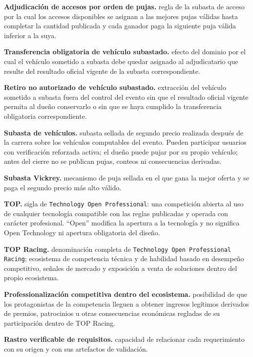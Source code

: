 \documentclass[10pt,letterpaper]{article}
\begin{document}
\noindent\textbf{Adjudicación de accesos por orden de pujas.} regla de la subasta de acceso por la cual los accesos disponibles se asignan a las mejores pujas válidas hasta completar la cantidad publicada y cada ganador paga la siguiente puja válida inferior a la suya.\par
\noindent\textbf{Transferencia obligatoria de vehículo subastado.} efecto del dominio por el cual el vehículo sometido a subasta debe quedar asignado al adjudicatario que resulte del resultado oficial vigente de la subasta correspondiente.\par
\noindent\textbf{Retiro no autorizado de vehículo subastado.} extracción del vehículo sometido a subasta fuera del control del evento sin que el resultado oficial vigente permita al dueño conservarlo o sin que se haya cumplido la transferencia obligatoria correspondiente.\par
\noindent\textbf{Subasta de vehículos.} subasta sellada de segundo precio realizada después de la carrera sobre los vehículos computables del evento. Pueden participar usuarios con verificación reforzada activa; el dueño puede pujar por su propio vehículo; antes del cierre no se publican pujas, conteos ni consecuencias derivadas.\par
\noindent\textbf{Subasta Vickrey.} mecanismo de puja sellada en el que gana la mejor oferta y se paga el segundo precio más alto válido.\par
\noindent\textbf{TOP.} sigla de \texttt{Technology Open Professional}: una competición abierta al uso de cualquier tecnología compatible con las reglas publicadas y operada con carácter profesional. ``Open'' modifica la apertura a la tecnología y no significa Open Technology ni apertura obligatoria del diseño.\par
\noindent\textbf{TOP Racing.} denominación completa de \texttt{Technology Open Professional Racing}; ecosistema de competencia técnica y de habilidad basado en desempeño competitivo, señales de mercado y exposición a venta de soluciones dentro del propio ecosistema.\par
\noindent\textbf{Professionalización competitiva dentro del ecosistema.} posibilidad de que los protagonistas de la competencia lleguen a obtener ingresos legítimos derivados de premios, patrocinios u otras consecuencias económicas regladas de su participación dentro de TOP Racing.\par
\noindent\textbf{Rastro verificable de requisitos.} capacidad de relacionar cada requerimiento con su origen y con sus artefactos de validación.\par
\end{document}
